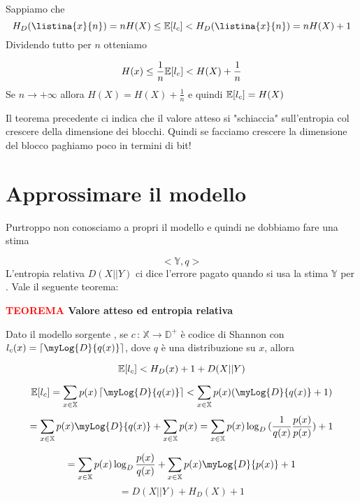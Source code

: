 \documentclass[12pt]{report}
\begin{document}
    \begin{dimo}
        Sappiamo che
        $$H_D(\listina{x}{n}) = n H(X) \leq \va[l_c] < H_D(\listina{x}{n}) = n H(X) + 1 $$
        Dividendo tutto per $n$ otteniamo

        $$H(x) \leq \frac{1}{n} \mathbb{E}[l_c] < H(X) + \frac{1}{n}$$
        Se $n \rightarrow + \infty$ allora $H(X) = H(X) + \frac{1}{n}$ e quindi  $\mathbb{E}[l_c] = H(X)$
    \end{dimo}

    \noindent
    Il teorema precedente ci indica che il valore atteso si "schiaccia" sull'entropia col crescere della dimensione dei blocchi. Quindi se facciamo crescere la dimensione del blocco paghiamo poco in termini di bit!

    \section{Approssimare il modello}
    Purtroppo non conosciamo a propri il modello \modello e quindi ne dobbiamo fare una stima

    $$<\!\mathbb{Y},q\!>$$
    L'entropia relativa $D(X||Y)$ ci dice l'errore pagato quando si usa la stima $\mathbb{Y}$ per \sorgente.
    Vale il seguente teorema:

    \vspace{5px}
    \begin{tcolorbox}
        \textbf{\textcolor{red}{TEOREMA} Valore atteso ed entropia relativa}
        \vspace{5px}
        \begin{center}
            Dato il modello sorgente \modello, se $c\,:\,\mathbb{X} \rightarrow \mathbb{D}^+$ è codice di Shannon con $l_c(x) = \lc \myLog{D}{q(x)} \rc$, dove $q$ è una distribuzione su $x$, allora

            $$\mathbb{E}[l_c] < H_D(x) + 1 + D(X||Y)$$
        \end{center}
    \end{tcolorbox}

    \begin{dimo}
        $$\va[l_c] = \sum_{x \in \mathbb{X}} p(x) \lc \myLog{D}{q(x)} \rc < \sum_{x \in \mathbb{X}} p(x) (\myLog{D}{q(x)} + 1)$$
        $$= \sum_{x \in \mathbb{X}} p(x) \myLog{D}{q(x)} + \sum_{x \in \mathbb{X}} p(x) = \sum_{x \in \mathbb{X}} p(x) \log_D{(\frac{1}{q(x)} \frac{p(x)}{p(x)})} + 1$$

        $$= \sum_{x \in \mathbb{X}} p(x) \log_D{\frac{p(x)}{q(x)}} + \sum_{x \in \mathbb{X}} p(x) \myLog{D}{p(x)} + 1$$
        $$= D(X || Y) + H_D(X) + 1$$
    \end{dimo}
\end{document}
